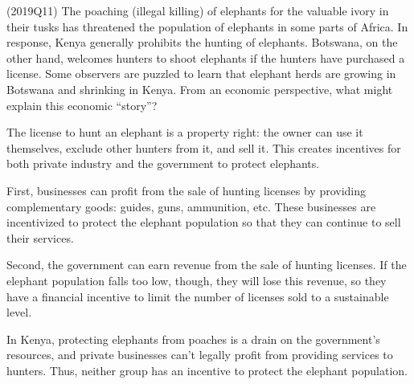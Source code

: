 \documentclass{exam}
\begin{document}
\begin{questions}
\question (2019Q11) The poaching (illegal killing) of elephants for the valuable ivory in their tusks has threatened the population of elephants in some parts of Africa.  In response, Kenya generally prohibits the hunting of elephants.  Botswana, on the other hand, welcomes hunters to shoot elephants if the hunters have purchased a license.  Some observers are puzzled to learn that elephant herds are growing in Botswana and shrinking in Kenya. From an economic perspective, what might explain this economic ``story''? 

\begin{solution}
The license to hunt an elephant is a property right: the owner can use it themselves, exclude other hunters from it, and sell it. This creates incentives for both private industry and the government to protect elephants.

First, businesses can profit from the sale of hunting licenses by providing complementary goods: guides, guns, ammunition, etc. These businesses are incentivized to protect the elephant population so that they can continue to sell their services.

Second, the government can earn revenue from the sale of hunting licenses. If the elephant population falls too low, though, they will lose this revenue, so they have a financial incentive to limit the number of licenses sold to a sustainable level.

In Kenya, protecting elephants from poaches is a drain on the government's resources, and private businesses can't legally profit from providing services to hunters. Thus, neither group has an incentive to protect the elephant population.
\end{solution}


\end{questions}
\end{document}

